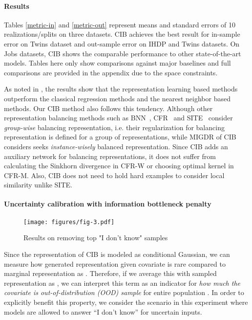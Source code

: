 \documentclass{article}
\begin{document}
    \paragraph{Results} Tables \ref{metric-in} and \ref{metric-out} represent means and standard errors of 10 realizations/splits on three datasets. CIB achieves the best result for in-sample error on Twins dataset and out-sample error on IHDP and Twins datasets. On Jobs datasets, CIB shows the comparable performance to other state-of-the-art models. Tables here only show comparisons against major baselines and full comparisons are provided in the appendix due to the space constraints. 
    
    As noted in \cite{yao2018}, the results show that the representation learning based methods outperform the classical regression methods and the nearest neighbor based methods. Our CIB method also follows this tendency. Although other representation balancing methods such as BNN~\cite{johansson16}, CFR~\cite{Shalit17} and SITE~\cite{yao2018} consider \emph{group-wise} balancing representation, i.e. their regularization for balancing representation is defined for a group of representations, while MIGDR of CIB considers seeks \emph{instance-wisely} balanced representation. Since CIB adds an auxiliary network for balancing representations, it does not suffer from calculating the Sinkhorn divergence in CFR-W or choosing optimal kernel in CFR-M. Also, CIB does not need to hold hard examples to consider local similarity unlike SITE.
        
    \vspace{-.1cm}
    \paragraph{Uncertainty calibration with information bottleneck penalty}
    
    \begin{wrapfigure}{r}{0.52\textwidth}
        \centering
        \vspace{-20pt}
        \texttt{[image: figures/fig-3.pdf]}
        \caption{Results on removing top  "I don't know" samples }
        \vspace{-12pt}
 	\label{fig:unc-calib}
    \end{wrapfigure}

    Since the representation of CIB is modeled as conditional Gaussian, we can measure how generated representation  given covariate  is rare compared to marginal representation as . Therefore, if we average this with sampled representation as , we can interpret this term as an indicator for \textit{how much the covariate  is out-of-distribution (OOD) sample} for entire population  \cite{alemi2018}. In order to explicitly benefit this property, we consider the scenario in this experiment where models are allowed to answer ``I don't know'' for uncertain inputs. 
    
\end{document}
